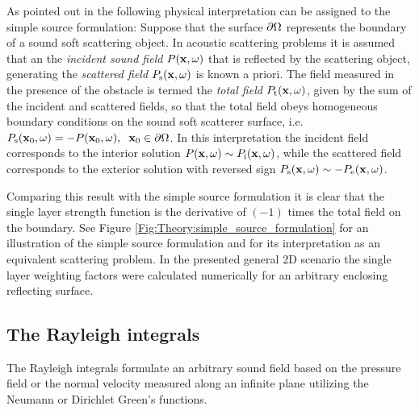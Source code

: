 \vspace{3mm}
As pointed out in \cite{Fazi2013:Equivalent_scattering, Fazi2010, Schultz2014:Comparing_approaches, Zotter2013:uniqueness} the following physical interpretation can be assigned to the simple source formulation: 
Suppose that the surface $\partial \Omega$ represents the boundary of a sound soft scattering object.
In acoustic scattering problems it is assumed that an the \emph{incident sound field} $P(\mathbf{x},\omega)$ that is reflected by the scattering object, generating the \emph{scattered field} $P_{\mathrm{s}}(\mathbf{x},\omega)$ is known a priori.
The field measured in the presence of the obstacle is termed the \emph{total field} $P_{\mathrm{t}}(\mathbf{x},\omega)$, given by the sum of the incident and scattered fields, so that the total field obeys homogeneous boundary conditions on the sound soft scatterer surface, i.e. $P_{\mathrm{s}}(\mathbf{x}_0,\omega) = -P(\mathbf{x}_0,\omega), \hspace{.2cm} \mathbf{x}_0 \in \partial \Omega$.
In this interpretation the incident field corresponds to the interior solution $P(\mathbf{x},\omega) \sim P_{\mathrm{i}}(\mathbf{x},\omega)$, while the scattered field corresponds to the exterior solution with reversed sign $P_{\mathrm{s}}(\mathbf{x},\omega) \sim -P_{\mathrm{e}}(\mathbf{x},\omega)$.

Comparing this result with the simple source formulation it is clear that the single layer strength function is the derivative of $(-1)$ times the total field on the boundary.
See Figure \ref{Fig:Theory:simple_source_formulation} for an illustration of the simple source formulation and for its interpretation as an equivalent scattering problem.
In the presented general 2D scenario the single layer weighting factors were calculated numerically for an arbitrary enclosing reflecting surface.

\subsection{The Rayleigh integrals}
\label{Section:Theory:Rayleigh}

The Rayleigh integrals formulate an arbitrary sound field based on the pressure field or the normal velocity measured along an infinite plane utilizing the Neumann or Dirichlet Green's functions.

